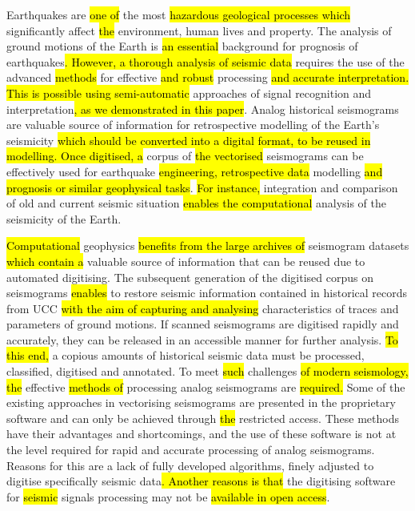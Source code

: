 \documentclass[sensors,article,submit,moreauthors,pdftex]{Definitions/mdpi}
\begin{document}
Earthquakes are \hl{one of }the most \hl{hazardous geological processes which }significantly affect\hl{ the }environment, human\hl{ }lives and property. The analysis of ground motions of the Earth is \hl{an essential }background for prognosis of earthquakes\hl{. However, a thorough analysis of seismic data }requires the use of the advanced \hl{methods }for effective \hl{and robust }processing\hl{ and accurate interpretation. This is possible using semi-automatic }approaches of signal recognition and interpretation\hl{, as we demonstrated in this paper}. Analog historical seismograms are valuable source of information for retrospective modelling of the Earth's seismicity\hl{ which should be converted into a digital format, to be reused in modelling. Once digitised, a} corpus of \hl{the vectorised }seismograms can be effectively used\hl{ }for earthquake \hl{engineering, retrospective data }modelling \hl{and prognosis or similar geophysical tasks}. \hl{For instance, }integration and comparison of old and current seismic situation\hl{ enables the computational }analysis of the seismicity of the Earth.  

\hl{Computational} geophysics \hl{benefits from the large archives of }seismogram datasets \hl{which contain a }valuable source of information that can be reused due to automated digitising. The subsequent generation of the digitised corpus on seismograms\hl{ enables }to restore seismic information contained in historical records from \ac{UCC} \hl{with the aim of capturing and analysing} characteristics of traces and parameters of ground motions. If scanned seismograms are digitised rapidly and accurately, they can be released in an accessible manner for further analysis. \hl{To this end, }a copious amounts of historical seismic data must be processed, classified, digitised and annotated. To meet\hl{ such }challenges \hl{of modern seismology, the }effective \hl{methods of }processing analog seismograms are\hl{ required. }Some of the existing approaches in vectorising seismograms are presented in the proprietary software and can only be achieved through \hl{the }restricted access. These methods have their advantages and shortcomings, and the use of these software is not at the level required for rapid and accurate processing of analog seismograms. Reasons for this are a lack of fully developed\hl{ }algorithms, finely adjusted to digitise specifically seismic data\hl{. Another reasons is that }the\hl{ }digitising software for \hl{seismic }signals processing may not be \hl{available in open access}. 
\end{document}
